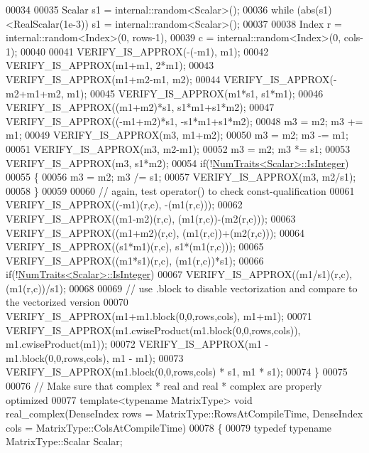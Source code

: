 \begin{DoxyCode}
00034 
00035   Scalar s1 = internal::random<Scalar>();
00036   \textcolor{keywordflow}{while} (abs(s1)<RealScalar(1e-3)) s1 = internal::random<Scalar>();
00037 
00038   Index r = internal::random<Index>(0, rows-1),
00039         c = internal::random<Index>(0, cols-1);
00040 
00041   VERIFY\_IS\_APPROX(-(-m1),                  m1);
00042   VERIFY\_IS\_APPROX(m1+m1,                   2*m1);
00043   VERIFY\_IS\_APPROX(m1+m2-m1,                m2);
00044   VERIFY\_IS\_APPROX(-m2+m1+m2,               m1);
00045   VERIFY\_IS\_APPROX(m1*s1,                   s1*m1);
00046   VERIFY\_IS\_APPROX((m1+m2)*s1,              s1*m1+s1*m2);
00047   VERIFY\_IS\_APPROX((-m1+m2)*s1,             -s1*m1+s1*m2);
00048   m3 = m2; m3 += m1;
00049   VERIFY\_IS\_APPROX(m3,                      m1+m2);
00050   m3 = m2; m3 -= m1;
00051   VERIFY\_IS\_APPROX(m3,                      m2-m1);
00052   m3 = m2; m3 *= s1;
00053   VERIFY\_IS\_APPROX(m3,                      s1*m2);
00054   \textcolor{keywordflow}{if}(!\hyperlink{group___core___module_struct_eigen_1_1_num_traits}{NumTraits<Scalar>::IsInteger})
00055   \{
00056     m3 = m2; m3 /= s1;
00057     VERIFY\_IS\_APPROX(m3,                    m2/s1);
00058   \}
00059 
00060   \textcolor{comment}{// again, test operator() to check const-qualification}
00061   VERIFY\_IS\_APPROX((-m1)(r,c), -(m1(r,c)));
00062   VERIFY\_IS\_APPROX((m1-m2)(r,c), (m1(r,c))-(m2(r,c)));
00063   VERIFY\_IS\_APPROX((m1+m2)(r,c), (m1(r,c))+(m2(r,c)));
00064   VERIFY\_IS\_APPROX((s1*m1)(r,c), s1*(m1(r,c)));
00065   VERIFY\_IS\_APPROX((m1*s1)(r,c), (m1(r,c))*s1);
00066   \textcolor{keywordflow}{if}(!\hyperlink{group___core___module_struct_eigen_1_1_num_traits}{NumTraits<Scalar>::IsInteger})
00067     VERIFY\_IS\_APPROX((m1/s1)(r,c), (m1(r,c))/s1);
00068 
00069   \textcolor{comment}{// use .block to disable vectorization and compare to the vectorized version}
00070   VERIFY\_IS\_APPROX(m1+m1.block(0,0,rows,cols), m1+m1);
00071   VERIFY\_IS\_APPROX(m1.cwiseProduct(m1.block(0,0,rows,cols)), m1.cwiseProduct(m1));
00072   VERIFY\_IS\_APPROX(m1 - m1.block(0,0,rows,cols), m1 - m1);
00073   VERIFY\_IS\_APPROX(m1.block(0,0,rows,cols) * s1, m1 * s1);
00074 \}
00075 
00076 \textcolor{comment}{// Make sure that complex * real and real * complex are properly optimized}
00077 \textcolor{keyword}{template}<\textcolor{keyword}{typename} MatrixType> \textcolor{keywordtype}{void} real\_complex(DenseIndex rows = MatrixType::RowsAtCompileTime, DenseIndex
       cols = MatrixType::ColsAtCompileTime)
00078 \{
00079   \textcolor{keyword}{typedef} \textcolor{keyword}{typename} MatrixType::Scalar Scalar;

\end{DoxyCode}
